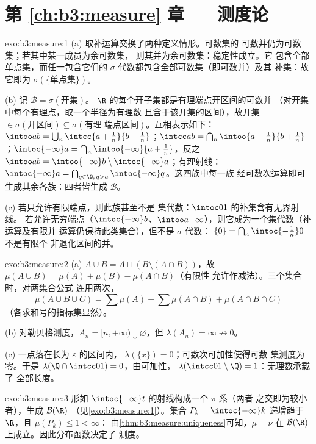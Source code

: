 \section*{第 \ref{ch:b3:measure} 章 --- 测度论}

\begin{solution}{exo:b3:measure:1}
(a) 取补运算交换了两种定义情形。可数集的
可数并仍为可数集；若其中某一成员为余可数集，
则其并为余可数集：稳定性成立。它
包含全部单点集，而任一包含它们的
$\sigma$-代数都包含全部可数集（即可数并）及其
补集：故它即为 $\sigma(\{\text{单点集}\})$。

(b) 记 $\mathcal B = \sigma(\text{开集})$。
$\R$ 的每个开子集都是有理端点开区间的可数并
（对开集中每个有理点，取一个半径为有理数
且含于该开集的区间），故开集 $\in
\sigma(\text{开区间}) \subseteq \sigma(\text{有理
端点区间})$。互相表示如下：$\intoo ab = \bigcup_n\intcc{a +
\frac1n}{b - \frac1n}$；$\intcc ab = \bigcap_n \intoo{a -
\frac1n}{b + \frac1n}$；$\intoc{-\infty}a = \bigcap_n
\intoo{-\infty}{a + \frac1n}$，反之 $\intoo ab =
\intoo{-\infty}b \setminus \intoc{-\infty}a$；有理射线：
$\intoc{-\infty}a =
\bigcap_{q \in \Q,\, q > a}\intoc{-\infty}q$。这四族中每一族
经可数次运算即可生成其余各族：四者皆生成
$\mathcal B$。

(c) 若只允许有限端点，则此族甚至不是
集代数：$\intoc01$ 的补集含有无界射线。
若允许无穷端点（$\intoc{-\infty}b$、$\intoo
a{+\infty}$），则它成为一个集代数（补运算及有限并
运算仍保持此类集合），但不是 $\sigma$-代数：
$\{0\} = \bigcap_n\intoc{-\frac1n}0$ 不是有限个
非退化区间的并。
\end{solution}

\begin{solution}{exo:b3:measure:2}
(a) $A \cup B = A \sqcup (B \setminus (A\cap B))$，故
$\mu(A\cup B) = \mu(A) + \mu(B) - \mu(A\cap B)$（有限性
允许作减法）。三个集合时，对两集合公式
连用两次，
\[
\mu(A\cup B\cup C) = \sum\mu(A) - \sum\mu(A\cap B) +
\mu(A\cap B\cap C)
\]
（各求和号的指标集显然）。

(b) 对勒贝格测度，$A_n = [n, +\infty) \downarrow
\varnothing$，但 $\lambda(A_n) = \infty \not\to 0$。

(c) 一点落在长为 $\varepsilon$ 的区间内，
$\lambda(\{x\}) = 0$；可数次可加性使得可数
集测度为零。于是 $\lambda(\Q \cap \intcc01) = 0$，由可加性，
$\lambda(\intcc01\setminus\Q) = 1$：无理数承载了
全部长度。
\end{solution}

\begin{solution}{exo:b3:measure:3}
形如 $\intoc{-\infty}t$ 的射线构成一个 $\pi$-系（两者
之交即为较小者），生成 $\mathcal B(\R)$
（见\cref{exo:b3:measure:1}）。集合 $P_k = \intoc{-\infty}k$
递增趋于 $\R$，且 $\mu(P_k) \leq 1 < \infty$：
由\cref{thm:b3:measure:uniqueness}可知，$\mu = \nu$ 在
$\mathcal B(\R)$ 上成立。因此分布函数决定了
测度。
\end{solution}


